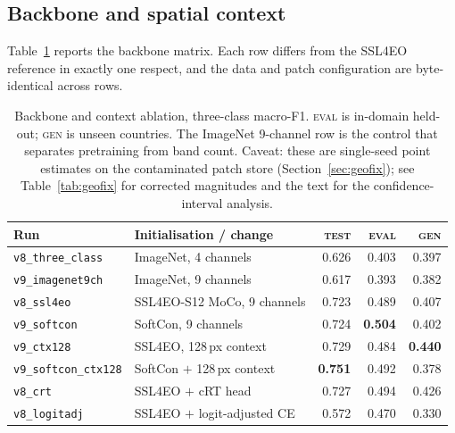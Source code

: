\documentclass[11pt,a4paper]{article}
\newcommand{\code}[1]{\texttt{\small #1}}
\begin{document}
\subsection{Backbone and spatial context}
\label{sec:backbone}

Table~\ref{tab:backbone} reports the backbone matrix. Each row differs from the
SSL4EO reference in exactly one respect, and the data and patch configuration
are byte-identical across rows.

\begin{table}[t]
\centering
\small
\caption{Backbone and context ablation, three-class macro-F1. \textsc{eval} is
in-domain held-out; \textsc{gen} is unseen countries. The ImageNet 9-channel row
is the control that separates pretraining from band count. Caveat: these are
single-seed point estimates on the contaminated patch store
(Section~\ref{sec:geofix}); see Table~\ref{tab:geofix} for corrected magnitudes
and the text for the confidence-interval analysis.}
\label{tab:backbone}
\begin{tabular}{llrrr}
\toprule
Run & Initialisation / change & \textsc{test} & \textsc{eval} & \textsc{gen} \\
\midrule
\code{v8\_three\_class}    & ImageNet, 4 channels          & 0.626 & 0.403 & 0.397 \\
\code{v9\_imagenet9ch}     & ImageNet, 9 channels          & 0.617 & 0.393 & 0.382 \\
\code{v8\_ssl4eo}          & SSL4EO-S12 MoCo, 9 channels   & 0.723 & 0.489 & 0.407 \\
\code{v9\_softcon}         & SoftCon, 9 channels           & 0.724 & \textbf{0.504} & 0.402 \\
\code{v9\_ctx128}          & SSL4EO, 128\,px context       & 0.729 & 0.484 & \textbf{0.440} \\
\code{v9\_softcon\_ctx128} & SoftCon $+$ 128\,px context   & \textbf{0.751} & 0.492 & 0.378 \\
\code{v8\_crt}             & SSL4EO $+$ cRT head           & 0.727 & 0.494 & 0.426 \\
\code{v8\_logitadj}        & SSL4EO $+$ logit-adjusted CE  & 0.572 & 0.470 & 0.330 \\
\bottomrule
\end{tabular}
\end{table}
\end{document}
